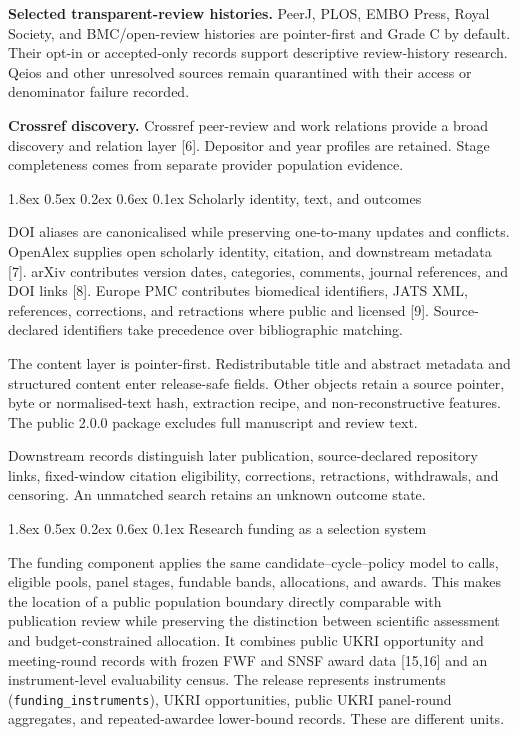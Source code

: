\documentclass[
  10pt,
]{article}
\makeatletter
\renewcommand\subsubsection{\@startsection{subsubsection}{3}{\z@}%
  {1.8ex \@plus 0.5ex \@minus 0.2ex}%
  {0.6ex \@plus 0.1ex}%
  {\normalfont\normalsize\sffamily\bfseries\color{OSGInk}}}
\makeatother
\begin{document}
\textbf{Selected transparent-review histories.} PeerJ, PLOS, EMBO Press,
Royal Society, and BMC/open-review histories are pointer-first and Grade
C by default. Their opt-in or accepted-only records support descriptive
review-history research. Qeios and other unresolved sources remain
quarantined with their access or denominator failure recorded.

\textbf{Crossref discovery.} Crossref peer-review and work relations
provide a broad discovery and relation layer {[}6{]}. Depositor and year
profiles are retained. Stage completeness comes from separate provider
population evidence.

\subsubsection{Scholarly identity, text, and
outcomes}\label{33-scholarly-identity-text-and-outcomes}

DOI aliases are canonicalised while preserving one-to-many updates and
conflicts. OpenAlex supplies open scholarly identity, citation, and
downstream metadata {[}7{]}. arXiv contributes version dates,
categories, comments, journal references, and DOI links {[}8{]}. Europe
PMC contributes biomedical identifiers, JATS XML, references,
corrections, and retractions where public and licensed {[}9{]}.
Source-declared identifiers take precedence over bibliographic matching.

The content layer is pointer-first. Redistributable title and abstract
metadata and structured content enter release-safe fields. Other objects
retain a source pointer, byte or normalised-text hash, extraction recipe,
and non-reconstructive features. The public 2.0.0 package excludes full
manuscript and review text.

Downstream records distinguish later publication, source-declared
repository links, fixed-window citation eligibility, corrections,
retractions, withdrawals, and censoring. An unmatched search retains an
unknown outcome state.

\subsubsection{Research funding as a selection system}\label{34-funding}

The funding component applies the same candidate--cycle--policy model to
calls, eligible pools, panel stages, fundable bands, allocations, and
awards. This makes the location of a public population boundary directly
comparable with publication review while preserving the distinction
between scientific assessment and budget-constrained allocation. It
combines public UKRI opportunity and meeting-round records with frozen
FWF and SNSF award data {[}15,16{]} and an instrument-level evaluability
census. The release represents \OSGClaimFundingInstruments{} instruments
(\texttt{funding\_instruments}), \OSGClaimUkriOpportunities{} UKRI
opportunities, \OSGClaimUkriPanelRounds{} public UKRI panel-round aggregates,
and \OSGClaimRepeatAwardeeLowerBounds{} repeated-awardee lower-bound records.
These are different units.
\end{document}
